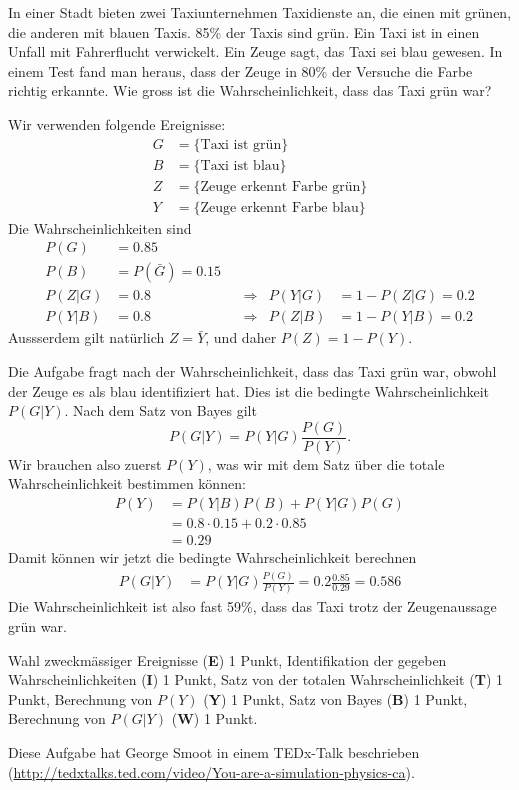 In einer Stadt bieten zwei Taxiunternehmen Taxidienste an, die einen mit
grünen, die anderen mit blauen Taxis. 85\% der Taxis sind grün.
Ein Taxi ist in einen Unfall mit Fahrerflucht verwickelt.
Ein Zeuge sagt, das Taxi sei blau gewesen.
In einem Test fand man heraus, dass der Zeuge in 80\% der Versuche
die Farbe richtig erkannte.
Wie gross ist die Wahrscheinlichkeit, dass das Taxi grün war?

\begin{loesung}
Wir verwenden folgende Ereignisse:
\begin{align*}
G&=\{\text{Taxi ist grün}\}\\
B&=\{\text{Taxi ist blau}\}\\
Z&=\{\text{Zeuge erkennt Farbe grün}\}\\
Y&=\{\text{Zeuge erkennt Farbe blau}\}
\end{align*}
Die Wahrscheinlichkeiten sind
\begin{align*}
P(G)&=0.85\\
P(B)&=P(\bar G)=0.15\\
P(Z|G)&=0.8 &&\Rightarrow& P(Y|G)&=1-P(Z|G)=0.2\\
P(Y|B)&=0.8 &&\Rightarrow& P(Z|B)&=1-P(Y|B)=0.2
\end{align*}
Aussserdem gilt natürlich $Z=\bar Y$, und daher $P(Z)=1-P(Y)$.

Die Aufgabe fragt nach der Wahrscheinlichkeit, dass das Taxi grün war,
obwohl der Zeuge es als blau identifiziert hat.
Dies ist die bedingte Wahrscheinlichkeit $P(G|Y)$. Nach dem Satz von
Bayes gilt
\[
P(G|Y)=P(Y|G)\frac{P(G)}{P(Y)}.
\]
Wir brauchen also zuerst $P(Y)$, was wir mit dem Satz über die totale
Wahrscheinlichkeit bestimmen können:
\begin{align*}
P(Y)
&=
P(Y|B)P(B) + P(Y|G)P(G)\\
&=
0.8 \cdot 0.15 + 0.2 \cdot 0.85\\
&=0.29
\end{align*}
Damit können wir jetzt die bedingte Wahrscheinlichkeit berechnen
\begin{align*}
P(G|Y)
&=
P(Y|G)\frac{P(G)}{P(Y)}
=
0.2\frac{0.85}{0.29}
=
0.586
\end{align*}
Die Wahrscheinlichkeit ist also fast 59\%, dass das Taxi trotz der
Zeugenaussage grün war.
\end{loesung}

\begin{bewertung}
Wahl zweckmässiger Ereignisse ({\bf E}) 1 Punkt,
Identifikation der gegeben Wahrscheinlichkeiten ({\bf I}) 1 Punkt,
Satz von der totalen Wahrscheinlichkeit ({\bf T}) 1 Punkt,
Berechnung von $P(Y)$ ({\bf Y}) 1 Punkt,
Satz von Bayes ({\bf B}) 1 Punkt,
Berechnung von $P(G|Y)$ ({\bf W}) 1 Punkt.
\end{bewertung}

\begin{diskussion}
Diese Aufgabe hat George Smoot in einem TEDx-Talk beschrieben
(\url{http://tedxtalks.ted.com/video/You-are-a-simulation-physics-ca}).
\end{diskussion}

